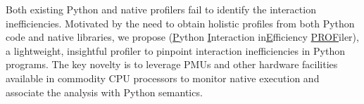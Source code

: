 


Both existing Python and native profilers fail to identify the interaction inefficiencies. Motivated by the need to obtain holistic profiles from both Python code and native libraries, we propose \tool (\underline{P}ython \underline{I}nteraction in\underline{E}fficiency \underline{PROF}iler), a lightweight, insightful profiler to pinpoint interaction inefficiencies in Python programs. The key novelty is to leverage PMUs and other hardware facilities available in commodity CPU processors to monitor native execution and associate the analysis with Python semantics. 

